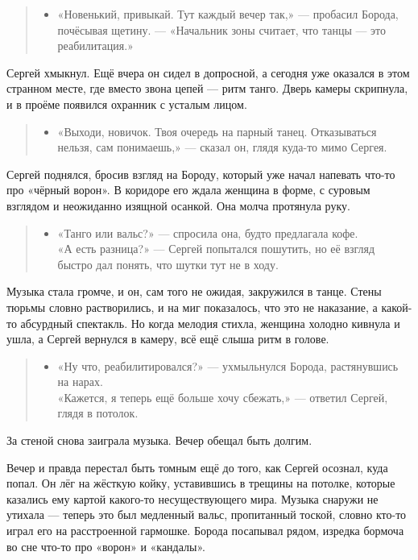 \documentclass[12pt,a4paper]{book}
\newenvironment{dialogue}{\begin{quote}\itshape\begin{itemize}\item[]}{\end{itemize}\end{quote}}
\begin{document}
\begin{dialogue}
«Новенький, привыкай. Тут каждый вечер так,» --- пробасил Борода, почёсывая щетину. --- «Начальник зоны считает, что танцы --- это реабилитация.»
\end{dialogue}

Сергей хмыкнул. Ещё вчера он сидел в допросной, а сегодня уже оказался в этом странном месте, где вместо звона цепей --- ритм танго. Дверь камеры скрипнула, и в проёме появился охранник с усталым лицом.

\begin{dialogue}
«Выходи, новичок. Твоя очередь на парный танец. Отказываться нельзя, сам понимаешь,» --- сказал он, глядя куда-то мимо Сергея.
\end{dialogue}

Сергей поднялся, бросив взгляд на Бороду, который уже начал напевать что-то про «чёрный ворон». В коридоре его ждала женщина в форме, с суровым взглядом и неожиданно изящной осанкой. Она молча протянула руку.

\begin{dialogue}
«Танго или вальс?» --- спросила она, будто предлагала кофе. \\
«А есть разница?» --- Сергей попытался пошутить, но её взгляд быстро дал понять, что шутки тут не в ходу.
\end{dialogue}

Музыка стала громче, и он, сам того не ожидая, закружился в танце. Стены тюрьмы словно растворились, и на миг показалось, что это не наказание, а какой-то абсурдный спектакль. Но когда мелодия стихла, женщина холодно кивнула и ушла, а Сергей вернулся в камеру, всё ещё слыша ритм в голове.

\begin{dialogue}
«Ну что, реабилитировался?» --- ухмыльнулся Борода, растянувшись на нарах. \\
«Кажется, я теперь ещё больше хочу сбежать,» --- ответил Сергей, глядя в потолок.
\end{dialogue}

За стеной снова заиграла музыка. Вечер обещал быть долгим.

Вечер и правда перестал быть томным ещё до того, как Сергей осознал, куда попал. Он лёг на жёсткую койку, уставившись в трещины на потолке, которые казались ему картой какого-то несуществующего мира. Музыка снаружи не утихала --- теперь это был медленный вальс, пропитанный тоской, словно кто-то играл его на расстроенной гармошке. Борода посапывал рядом, изредка бормоча во сне что-то про «ворон» и «кандалы».
\end{document}
